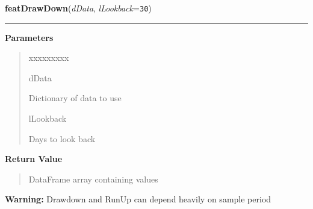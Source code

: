 \hspace{.8\funcindent}\begin{boxedminipage}{\funcwidth}

    \raggedright \textbf{featDrawDown}(\textit{dData}, \textit{lLookback}={\tt 30})

    \vspace{-1.5ex}

    \rule{\textwidth}{0.5\fboxrule}
\setlength{\parskip}{2ex}
\setlength{\parskip}{1ex}
      \textbf{Parameters}
      \vspace{-1ex}

      \begin{quote}
        \begin{Ventry}{xxxxxxxxx}

          \item[dData]

          Dictionary of data to use

          \item[lLookback]

          Days to look back

        \end{Ventry}

      \end{quote}

      \textbf{Return Value}
    \vspace{-1ex}

      \begin{quote}
      DataFrame array containing values

      \end{quote}

\textbf{Warning:} Drawdown and RunUp can depend heavily on sample period



    \end{boxedminipage}

    \label{QSTK:qstkfeat:features:featRunUp}

    \vspace{0.5ex}

